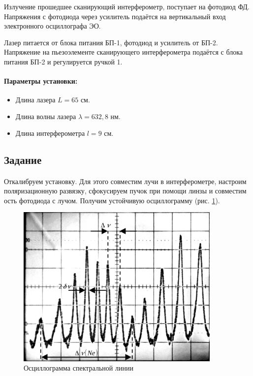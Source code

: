 \documentclass[a4paper,12pt]{article} %
\begin{document}
Излучение прошедшее сканирующий интерферометр, поступает на фотодиод ФД. Напряжения с фотодиода через усилитель подаётся на вертикальный вход электронного осциллографа ЭО. 

Лазер питается от блока питания БП-1, фотодиод и усилитель от БП-2. Напряжение на пьезоэлементе сканирующего интерферометра подаётся с блока питания БП-2 и регулируется ручкой 1.

\paragraph{Параметры установки:}
\begin{itemize}
\renewcommand{\labelitemi}{$\triangleright$}
\itemsep0em
\item Длина лазера $L = 65$ см.
\item Длина волны лазера $\lambda = 632,8$ нм.
\item Длина интерферометра $l = 9$ см.
\end{itemize}

\subsection{Задание}

\paragraph{} Откалибруем установку. Для этого совместим лучи в интерферометре, настроим поляризационную развязку, сфокусируем пучок при помощи линзы и совместим ость фотодиода с лучом. Получим устойчивую осциллограмму (рис. \ref{osc}).

\begin{figure}
\centering
\includegraphics[width=10cm]{osc2.png}
\caption{Осциллограмма спектральной линии}
\label{osc}
\end{figure}
\end{document}
